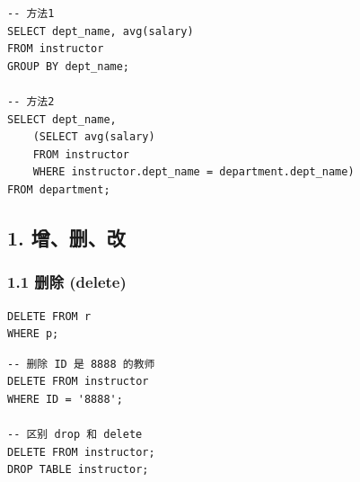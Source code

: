 \documentclass[aspectratio=169, 14pt]{beamer}
\begin{document}
\begin{frame}[fragile]

	\begin{verbatim}
-- 方法1
SELECT dept_name, avg(salary)
FROM instructor
GROUP BY dept_name;

-- 方法2
SELECT dept_name,
    (SELECT avg(salary)
    FROM instructor
    WHERE instructor.dept_name = department.dept_name)
FROM department;
    \end{verbatim}

\end{frame}

{
\begin{frame}
	\section{\textcolor{darkmidnightblue}{1. 增、删、改}}
\end{frame}

}

\begin{frame}[fragile]
	\frametitle{1.1 删除 (delete)}

	\begin{verbatim}
DELETE FROM r
WHERE p;
    \end{verbatim}

	\begin{verbatim}
-- 删除 ID 是 8888 的教师
DELETE FROM instructor
WHERE ID = '8888';

-- 区别 drop 和 delete
DELETE FROM instructor;
DROP TABLE instructor;
    \end{verbatim}

\end{frame}
\end{document}
